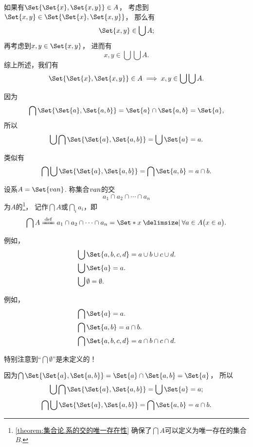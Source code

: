 \begin{example}\label{example:集合论.有序对各坐标的取值范围}
如果有\(\Set{ \Set{x}, \Set{x,y} } \in A\)，
考虑到\(\Set{x,y} \in \Set{ \Set{x}, \Set{x,y} }\)，
那么有\[
	\Set{x,y} \in \bigcup A;
\]
再考虑到\(x,y \in \Set{x,y}\)，
进而有\[
	x,y \in \bigcup\bigcup A.
\]
综上所述，我们有
\begin{equation}
	\Set{ \Set{x}, \Set{x,y} } \in A
	\implies
	x,y \in \bigcup\bigcup A.
\end{equation}
\end{example}

\begin{example}
因为\[
	\bigcap\Set{\Set{a},\Set{a,b}}
	= \Set{a}\cap\Set{a,b}
	= \Set{a},
\]
所以\[
	\bigcup\bigcap\Set{\Set{a},\Set{a,b}}
	= \bigcup\Set{a}
	= a.
\]

类似有\[
	\bigcap\bigcup\Set{\Set{a},\Set{a,b}}
	= \bigcap\Set{a,b}
	= a \cap b.
\]
\end{example}


\begin{definition}
设系\(A = \Set{\v{a}{n}}\).
称集合\(v{a}{n}\)的交\[
	a_1 \cap a_2 \cap \dotsb \cap a_n
\]为\(A\)的\footnote{%
\cref{theorem:集合论.系的交的唯一存在性} 确保了\(\bigcap A\)可以定义为唯一存在的集合\(B\).
}，%
记作\(\bigcap A\)或\(\bigcap\limits_i a_i\)，即\[
	\bigcap A
	\defeq
	a_1 \cap a_2 \cap \dotsb \cap a_n
	= \Set*{ x \given \forall a \in A \bigl(x \in a\bigr) }.
\]
\end{definition}

例如，
\begin{align*}
	&\bigcup\Set{a,b,c,d} = a \cup b \cup c \cup d. \\
	&\bigcup\Set{a} = a. \\
	&\bigcup\emptyset = \emptyset.
\end{align*}

例如，
\begin{align*}
	&\bigcap\Set{a} = a. \\
	&\bigcap\Set{a,b} = a \cap b. \\
	&\bigcap\Set{a,b,c,d} = a \cap b \cap c \cap d.
\end{align*}

特别注意到“\(\bigcap\emptyset\)”是未定义的！

\begin{example}
因为\(\bigcap\Set{ \Set{a}, \Set{a,b} } = \Set{a} \cap \Set{a,b} = \Set{a}\)，%
所以\[
\bigcup \bigcap \Set{ \Set{a}, \Set{a,b} } = \bigcup \Set{a} = a;
\]\[
\bigcap \bigcup \Set{ \Set{a}, \Set{a,b} } = \bigcap \Set{a,b} = a \cap b.
\]
\end{example}


